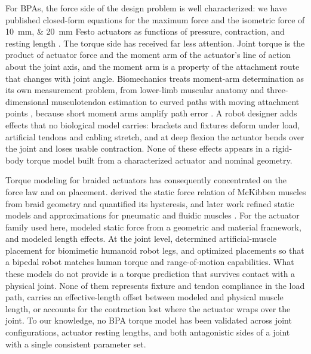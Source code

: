 For BPAs, the force side of the design problem is well characterized: we have published closed-form equations for the maximum force and the isometric force of \qtylist{10;20}{\mm} Festo actuators as functions of pressure, contraction, and resting length \citep{bolen_2026}. The torque side has received far less attention. Joint torque is the product of actuator force and the moment arm of the actuator's line of action about the joint axis, and the moment arm is a property of the attachment route that changes with joint angle. Biomechanics treats moment-arm determination as its own measurement problem, from lower-limb muscular anatomy \citep{brand_model_1982} and three-dimensional musculotendon estimation \citep{menegaldo_moment_2004} to curved paths with moving attachment points \citep{suderman_moving_2012}, because short moment arms amplify path error \citep{young_analyzing_2019}. A robot designer adds effects that no biological model carries: brackets and fixtures deform under load, artificial tendons and cabling stretch, and at deep flexion the actuator bends over the joint and loses usable contraction. None of these effects appears in a rigid-body torque model built from a characterized actuator and nominal geometry.

Torque modeling for braided actuators has consequently concentrated on the force law and on placement. \citet{chou_measurement_1996} derived the static force relation of McKibben muscles from braid geometry and quantified its hysteresis, and later work refined static models and approximations for pneumatic and fluidic muscles \citep{tondu_static_2022, sarosi_new_2012}. For the actuator family used here, \citet{martens_modeling_2017} modeled static force from a geometric and material framework, and \citet{hunt_modeling_2017} modeled length effects. At the joint level, \citet{bolen_determination_2019} determined artificial-muscle placement for biomimetic humanoid robot legs, and \citet{morrow_optimization_2020} optimized placements so that a bipedal robot matches human torque and range-of-motion capabilities. What these models do not provide is a torque prediction that survives contact with a physical joint. None of them represents fixture and tendon compliance in the load path, carries an effective-length offset between modeled and physical muscle length, or accounts for the contraction lost where the actuator wraps over the joint. To our knowledge, no BPA torque model has been validated across joint configurations, actuator resting lengths, and both antagonistic sides of a joint with a single consistent parameter set.


